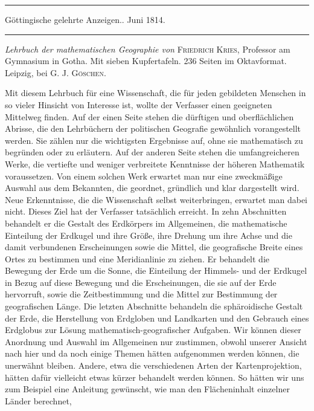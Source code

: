 \begin{center}
\rule{.85\textwidth}{.3pt}\par
Göttingische gelehrte Anzeigen.. Juni 1814.\par
\rule{.85\textwidth}{.3pt}
\end{center}
\hspace*{\parindent}\textit{Lehrbuch der mathematischen Geographie von} \textsc{Friedrich Kries}, Professor am Gymnasium in Gotha. Mit sieben Kupfertafeln. 236 Seiten im Oktavformat. Leipzig, bei \textsc{G. J. Göschen}.

Mit diesem Lehrbuch für eine Wissenschaft, die für jeden gebildeten Menschen in so vieler Hinsicht von Interesse ist, wollte der Verfasser einen geeigneten Mittelweg finden. Auf der einen Seite stehen die dürftigen und oberflächlichen Abrisse, die den Lehrbüchern der politischen Geografie gewöhnlich vorangestellt werden. Sie zählen nur die wichtigsten Ergebnisse auf, ohne sie mathematisch zu begründen oder zu erläutern. Auf der anderen Seite stehen die umfangreicheren Werke, die vertiefte und weniger verbreitete Kenntnisse der höheren Mathematik voraussetzen. Von einem solchen Werk erwartet man nur eine zweckmäßige Auswahl aus dem Bekannten, die geordnet, gründlich und klar dargestellt wird. Neue Erkenntnisse, die die Wissenschaft selbst weiterbringen, erwartet man dabei nicht. Dieses Ziel hat der Verfasser tatsächlich erreicht. In zehn Abschnitten behandelt er die Gestalt des Erdkörpers im Allgemeinen, die mathematische Einteilung der Erdkugel und ihre Größe, ihre Drehung um ihre Achse und die damit verbundenen Erscheinungen sowie die Mittel, die geografische Breite eines Ortes zu bestimmen und eine Meridianlinie zu ziehen. Er behandelt die Bewegung der Erde um die Sonne, die Einteilung der Himmels- und der Erdkugel in Bezug auf diese Bewegung und die Erscheinungen, die sie auf der Erde hervorruft, sowie die Zeitbestimmung und die Mittel zur Bestimmung der geografischen Länge. Die letzten Abschnitte behandeln die sphäroidische Gestalt der Erde, die Herstellung von Erdgloben und Landkarten und den Gebrauch eines Erdglobus zur Lösung mathematisch-geografischer Aufgaben. Wir können dieser Anordnung und Auswahl im Allgemeinen nur zustimmen, obwohl unserer Ansicht nach hier und da noch einige Themen hätten aufgenommen werden können, die unerwähnt bleiben. Andere, etwa die verschiedenen Arten der Kartenprojektion, hätten dafür vielleicht etwas kürzer behandelt werden können. So hätten wir uns zum Beispiel eine Anleitung gewünscht, wie man den Flächeninhalt einzelner Länder berechnet,
